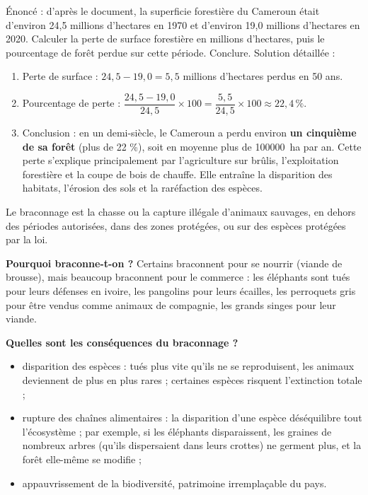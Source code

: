 \documentclass[11pt]{article}
\newcommand{\cle}[1]{{\popxbold\color{popdark}#1}}
\newcounter{popsec}
\newcounter{popsub}
\newcommand{\courssub}[1]{%
  \stepcounter{popsub}%
  \par\vspace{9pt}\noindent{\popxbold\fontsize{11.5}{13}\selectfont\color{popink}{\color{poporange}\thepopsec.\thepopsub}\hspace{6pt}#1}\par\nopagebreak\vspace{4pt}
}
\begin{document}
\begin{exoresolu}
Énoncé : d'après le document, la superficie forestière du Cameroun était d'environ 24,5 millions d'hectares en 1970 et d'environ 19,0 millions d'hectares en 2020. Calculer la perte de surface forestière en millions d'hectares, puis le pourcentage de forêt perdue sur cette période. Conclure.
\tcblower
Solution détaillée :
\begin{enumerate}
\item Perte de surface : $24{,}5 - 19{,}0 = 5{,}5$ millions d'hectares perdus en 50 ans.
\item Pourcentage de perte : $\dfrac{24{,}5 - 19{,}0}{24{,}5} \times 100 = \dfrac{5{,}5}{24{,}5} \times 100 \approx 22{,}4\,\%$.
\item Conclusion : en un demi-siècle, le Cameroun a perdu environ \textbf{un cinquième de sa forêt} (plus de 22 \%), soit en moyenne plus de \SI{100000}{ha} par an. Cette perte s'explique principalement par l'agriculture sur brûlis, l'exploitation forestière et la coupe de bois de chauffe. Elle entraîne la disparition des habitats, l'érosion des sols et la raréfaction des espèces.
\end{enumerate}
\end{exoresolu}

\courssub{Le braconnage}

\begin{definition}[Braconnage]
Le \cle{braconnage} est la chasse ou la capture illégale d'animaux sauvages, en dehors des périodes autorisées, dans des zones protégées, ou sur des espèces protégées par la loi.
\end{definition}

\textbf{Pourquoi braconne-t-on ?} Certains braconnent pour se nourrir (viande de brousse), mais beaucoup braconnent pour le \cle{commerce} : les éléphants sont tués pour leurs défenses en \cle{ivoire}, les pangolins pour leurs écailles, les perroquets gris pour être vendus comme animaux de compagnie, les grands singes pour leur viande.

\textbf{Quelles sont les conséquences du braconnage ?}

\begin{itemize}
\item \cle{disparition des espèces} : tués plus vite qu'ils ne se reproduisent, les animaux deviennent de plus en plus rares ; certaines espèces risquent l'extinction totale ;
\item \cle{rupture des chaînes alimentaires} : la disparition d'une espèce déséquilibre tout l'écosystème ; par exemple, si les éléphants disparaissent, les graines de nombreux arbres (qu'ils dispersaient dans leurs crottes) ne germent plus, et la forêt elle-même se modifie ;
\item appauvrissement de la \cle{biodiversité}, patrimoine irremplaçable du pays.
\end{itemize}
\end{document}
